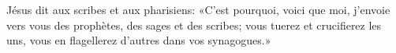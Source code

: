 \encetemps Jésus dit aux scribes et aux pharisiens:
	«C’est pourquoi, voici que moi, j’envoie vers vous des prophètes,
		des sages et des scribes;
	vous tuerez et crucifierez les uns,
	vous en flagellerez d’autres dans vos synagogues.»
